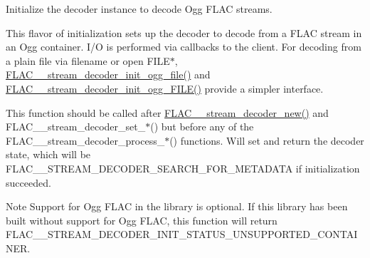 Initialize the decoder instance to decode Ogg F\+L\+AC streams.

This flavor of initialization sets up the decoder to decode from a F\+L\+AC stream in an Ogg container. I/O is performed via callbacks to the client. For decoding from a plain file via filename or open F\+I\+L\+E$\ast$, \mbox{\hyperlink{group__flac__stream__decoder_ga609f2a43987d6abeaef654575462030c}{F\+L\+A\+C\+\_\+\+\_\+stream\+\_\+decoder\+\_\+init\+\_\+ogg\+\_\+file()}} and \mbox{\hyperlink{group__flac__stream__decoder_gac6a35b1db07e057ec9912f637b37dd74}{F\+L\+A\+C\+\_\+\+\_\+stream\+\_\+decoder\+\_\+init\+\_\+ogg\+\_\+\+F\+I\+L\+E()}} provide a simpler interface.

This function should be called after \mbox{\hyperlink{group__flac__stream__decoder_ga7159eefc074dfbab4a37462f69326091}{F\+L\+A\+C\+\_\+\+\_\+stream\+\_\+decoder\+\_\+new()}} and F\+L\+A\+C\+\_\+\+\_\+stream\+\_\+decoder\+\_\+set\+\_\+$\ast$() but before any of the F\+L\+A\+C\+\_\+\+\_\+stream\+\_\+decoder\+\_\+process\+\_\+$\ast$() functions. Will set and return the decoder state, which will be F\+L\+A\+C\+\_\+\+\_\+\+S\+T\+R\+E\+A\+M\+\_\+\+D\+E\+C\+O\+D\+E\+R\+\_\+\+S\+E\+A\+R\+C\+H\+\_\+\+F\+O\+R\+\_\+\+M\+E\+T\+A\+D\+A\+TA if initialization succeeded.

\begin{DoxyNote}{Note}
Support for Ogg F\+L\+AC in the library is optional. If this library has been built without support for Ogg F\+L\+AC, this function will return {\ttfamily F\+L\+A\+C\+\_\+\+\_\+\+S\+T\+R\+E\+A\+M\+\_\+\+D\+E\+C\+O\+D\+E\+R\+\_\+\+I\+N\+I\+T\+\_\+\+S\+T\+A\+T\+U\+S\+\_\+\+U\+N\+S\+U\+P\+P\+O\+R\+T\+E\+D\+\_\+\+C\+O\+N\+T\+A\+I\+N\+ER}.
\end{DoxyNote}

